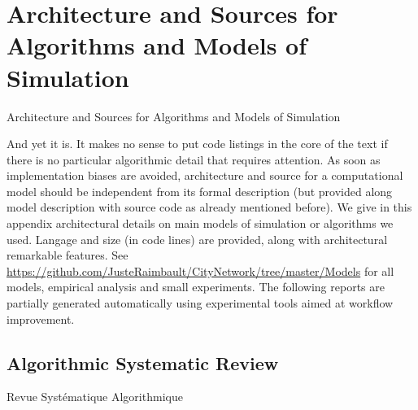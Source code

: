 

\section{Architecture and Sources for Algorithms and Models of Simulation}{Architecture and Sources for Algorithms and Models of Simulation} %

\label{app:code} %










And yet it is. It makes no sense to put code listings in the core of the text if there is no particular algorithmic detail that requires attention. As soon as implementation biases are avoided, architecture and source for a computational model should be independent from its formal description (but provided along model description with source code as already mentioned before). We give in this appendix architectural details on main models of simulation or algorithms we used. Langage and size (in code lines) are provided, along with architectural remarkable features. See \url{https://github.com/JusteRaimbault/CityNetwork/tree/master/Models} for all models, empirical analysis and small experiments. The following reports are partially generated automatically using experimental tools aimed at workflow improvement.




\subsection{Algorithmic Systematic Review}{Revue Systématique Algorithmique}

